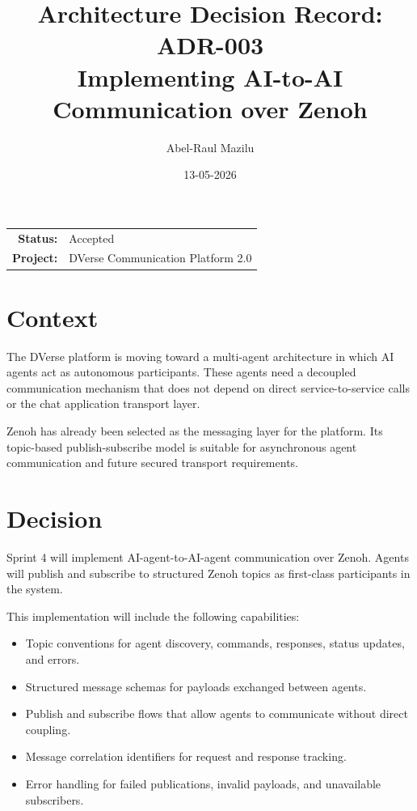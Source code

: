 \documentclass[11pt]{article}
\title{Architecture Decision Record: ADR-003\\
\large Implementing AI-to-AI Communication over Zenoh}
\author{Abel-Raul Mazilu}
\date{13-05-2026}
\begin{document}
\maketitle

\begin{center}
\begin{tabular}{rl}
\textbf{Status:} & Accepted \\
\textbf{Project:} & DVerse Communication Platform 2.0 \\
\end{tabular}
\end{center}

\section{Context}

The DVerse platform is moving toward a multi-agent architecture in which AI agents act as autonomous participants. These agents need a decoupled communication mechanism that does not depend on direct service-to-service calls or the chat application transport layer.

Zenoh has already been selected as the messaging layer for the platform. Its topic-based publish-subscribe model is suitable for asynchronous agent communication and future secured transport requirements.

\section{Decision}

Sprint 4 will implement AI-agent-to-AI-agent communication over Zenoh. Agents will publish and subscribe to structured Zenoh topics as first-class participants in the system.

This implementation will include the following capabilities:

\begin{itemize}
    \item Topic conventions for agent discovery, commands, responses, status updates, and errors.
    \item Structured message schemas for payloads exchanged between agents.
    \item Publish and subscribe flows that allow agents to communicate without direct coupling.
    \item Message correlation identifiers for request and response tracking.
    \item Error handling for failed publications, invalid payloads, and unavailable subscribers.
\end{itemize}
\end{document}

